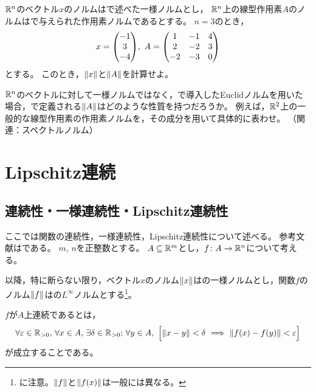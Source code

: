 \documentclass[b5paper,draft]{ltjsbook}
\begin{document}
\begin{prob}
    $\mathbb{R}^n$のベクトル$x$のノルムはで述べた一様ノルムとし，
    $\mathbb{R}^n$上の線型作用素$A$のノルムはで与えられた作用素ノルムであるとする。
    $n=3$のとき，
    \begin{equation}
        x=\vctr{-1\\3\\-4},\
        A=\pmat{1 & -1 & 4\\
            2 & -2 & 3\\
            -2 & -3 & 0
            }
    \end{equation}
    とする。
    このとき，$\norm{x}$と$\norm{A}$を計算せよ。
\end{prob}

\begin{prob}
    $\mathbb{R}^n$のベクトルに対して一様ノルムではなく，で導入したEuclidノルムを用いた場合，で定義される$\norm{A}$はどのような性質を持つだろうか。
    例えば，$\mathbb{R}^2$上の一般的な線型作用素の作用素ノルムを，その成分を用いて具体的に表わせ。
    （関連：スペクトルノルム）
\end{prob}


\section{Lipschitz連続}

\subsection{連続性・一様連続性・Lipschitz連続性}
ここでは関数の連続性，一様連続性，Lipschitz連続性について述べる。
参考文献は\cite{sugiura}である。
$m$, $n$を正整数とする。
$A\subseteq \mathbb{R}^m$とし，$f\colon A\to \mathbb{R}^n$について考える。

以降，特に断らない限り，ベクトル$x$のノルム$\norm{x}$はの一様ノルムとし，関数$f$のノルム$\norm{f}$はの$L^\infty$ノルムとする\footnote{に注意。$\norm{f}$と$\norm{\fun{f}{x}}$は一般には異なる。}。

\begin{defi}[連続性]
    $f$が$A$上連続であるとは，
    \begin{equation}
        \forall \varepsilon\in\Rposi,\, \forall x\in A,\, \exists \delta \in \Rposi;\, \forall y \in A,\ \bsqu{
            \norm{x-y}<\delta \ \Longrightarrow\ \norm{\fun{f}{x}-\fun{f}{y}}<\varepsilon
        }
    \end{equation}
    が成立することである。
\end{defi}
\end{document}
